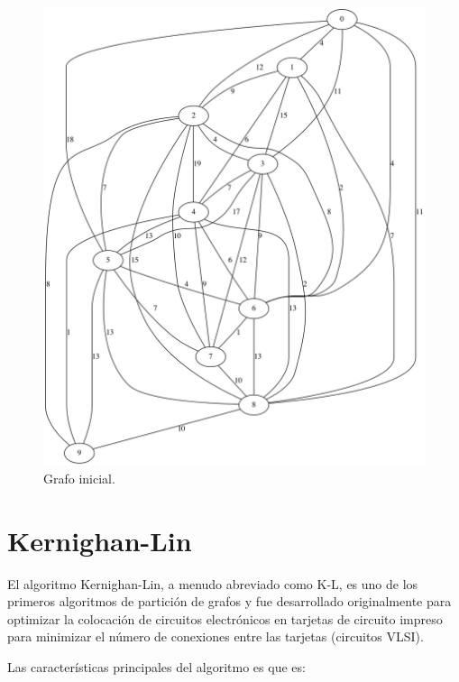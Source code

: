 \renewcommand{\figurename}{Figura}
\begin{figure}[h]
	\centering
	\includegraphics[scale=0.25]{Figures/10_dataset}
	\vspace{1mm}
	\caption{Grafo inicial.}
	\label{grafo}
\end{figure}

\newpage
\section{Kernighan-Lin}\label{Kernighan-Lin}

El algoritmo Kernighan-Lin\cite{KernighanLin}, a menudo abreviado como K-L, es uno de los primeros algoritmos de partición de grafos y fue desarrollado originalmente para optimizar la colocación de circuitos electrónicos en tarjetas de circuito impreso para minimizar el número de conexiones entre las tarjetas (circuitos VLSI\cite{KernighanLin}\cite{Ravikumar}).

Las características principales del algoritmo es que es:


